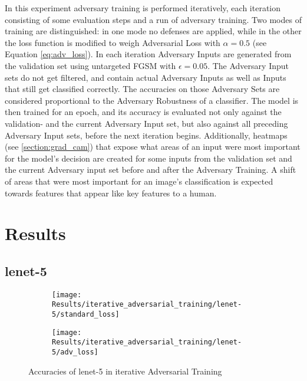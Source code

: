 \documentclass[draft,final]{vutinfth} %
\begin{document}
In this experiment adversary training is performed iteratively, each iteration consisting of some evaluation steps and a run of adversary training.
Two modes of training are distinguished: in one mode no defenses are applied, while in the other the loss function is modified to weigh Adversarial Loss with $\alpha = 0.5$ (see Equation \ref{eq:adv_loss}).
In each iteration Adversary Inputs are generated from the validation set using untargeted FGSM with $\epsilon = 0.05$.
The Adversary Input sets do not get filtered, and contain actual Adversary Inputs as well as Inputs that still get classified correctly.
The accuracies on those Adversary Sets are considered proportional to the Adversary Robustness of a classifier.
The model is then trained for an epoch, and its accuracy is evaluated not only against the validation- and the current Adversary Input set, but also against all preceding Adversary Input sets, before the next iteration begins.
Additionally, heatmaps (see \ref{section:grad_cam}) that expose what areas of an input were most important for the model's decision are created for some inputs from the validation set and the current Adversary input set before and after the Adversary Training.
A shift of areas that were most important for an image's classification is expected towards features that appear like key features to a human.

\section{Results}

\subsection{lenet-5}

\begin{figure}[h]
  \begin{subfigure}[b]{0.5\columnwidth}
		\centering
    \texttt{[image: Results/iterative\_adversarial\_training/lenet-5/standard\_loss]}
    \label{fig:exp:iat:lenet-5:data}
  \end{subfigure}
  \begin{subfigure}[b]{0.5\columnwidth}
		\centering
    \texttt{[image: Results/iterative\_adversarial\_training/lenet-5/adv\_loss]}
    \label{fig:exp:iat:lenet-5:loss}
  \end{subfigure}
  \caption{Accuracies of lenet-5 in iterative Adversarial Training}
\end{figure}
\end{document}
